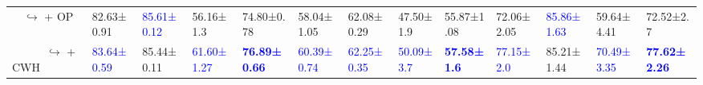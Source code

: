 \begin{table*}[t]
{\begin{tabular}{l|llla|llla|llla}
\ \  $\hookrightarrow$ + OP                  & 82.63{\scriptsize±0.91}                      & \textcolor{blue}{85.61{\scriptsize±0.12}}         & 56.16{\scriptsize±1.3}                     & 74.80{\scriptsize±0.78}  & 58.04{\scriptsize±1.05}                   & 62.08{\scriptsize±0.29}                   & 47.50{\scriptsize±1.9}                        & 55.87{\scriptsize±1.08}   & 72.06{\scriptsize±2.05}                   & \textcolor{blue}{85.86{\scriptsize±1.63}} & 59.64{\scriptsize±4.41}                       & 72.52{\scriptsize±2.7}\\    
\ \ \ \ \ \ $\hookrightarrow$ + CWH          & \textcolor{blue}{83.64{\scriptsize±0.59}}    & 85.44{\scriptsize±0.11}                           & \textcolor{blue}{61.60{\scriptsize±1.27}}  & \textbf{\textcolor{blue}{76.89{\scriptsize±0.66}}}  & \textcolor{blue}{60.39{\scriptsize±0.74}} & \textcolor{blue}{62.25{\scriptsize±0.35}} & \textcolor{blue}{50.09{\scriptsize±3.7}}      & \textbf{\textcolor{blue}{57.58{\scriptsize±1.6}}}    & \textcolor{blue}{77.15{\scriptsize±2.0}}  & 85.21{\scriptsize±1.44}                   & \textcolor{blue}{70.49{\scriptsize±3.35}}     & \textbf{\textcolor{blue}{77.62{\scriptsize±2.26}}} \\  
\bottomrule
    \end{tabular}}
    \label{tab:clear_all}
    \vspace{-0.05cm}
\end{table*}
